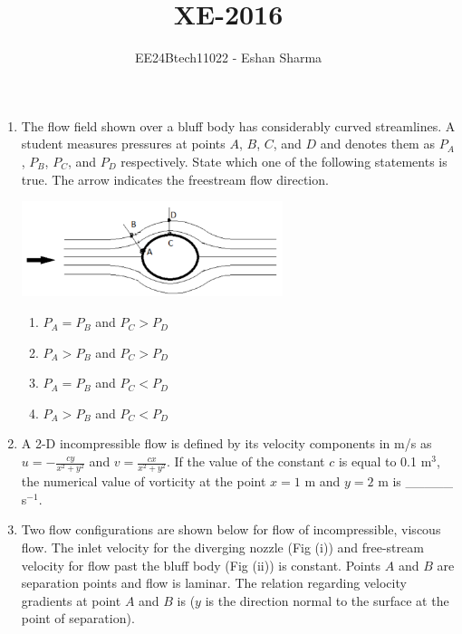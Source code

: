 \documentclass[journal,12pt,onecolumn]{IEEEtran}
\theoremstyle{remark}
\begin{document}

\vspace{3cm}

\title{XE-2016}
\author{EE24Btech11022 - Eshan Sharma}
\maketitle

\renewcommand{\thefigure}{\theenumi}
\renewcommand{\thetable}{\theenumi}



\begin{enumerate}
\item The flow field shown over a bluff body has considerably curved streamlines. A student measures pressures at points $A$, $B$, $C$, and $D$ and denotes them as $P_A$, $P_B$, $P_C$, and $P_D$ respectively. State which one of the following statements is true. The arrow indicates the freestream flow direction.\\

\begin{center}
	\includegraphics[width=0.6\textwidth]{figs/27.png}
\end{center}

\begin{enumerate}
	\item $P_A = P_B$ and $P_C > P_D$
	\item $P_A > P_B$ and $P_C > P_D$
	\item $P_A = P_B$ and $P_C < P_D$
	\item $P_A > P_B$ and $P_C < P_D$\\
\end{enumerate}

\item A 2-D incompressible flow is defined by its velocity components in m/s as $u = -\frac{c y}{x^2 + y^2}$ and $v = \frac{cx}{x^2 + y^2}$. If the value of the constant $c$ is equal to 0.1 m\(^3\), the numerical value of vorticity at the point $x = 1$ m and $y = 2$ m is \_\_\_\_\_ s\(^{-1}\).\\

\item Two flow configurations are shown below for flow of incompressible, viscous flow. The inlet velocity for the diverging nozzle (Fig (i)) and free-stream velocity for flow past the bluff body (Fig (ii)) is constant. Points $A$ and $B$ are separation points and flow is laminar. The relation regarding velocity gradients at point $A$ and $B$ is ($y$ is the direction normal to the surface at the point of separation).\\


\end{enumerate}
\end{document}
